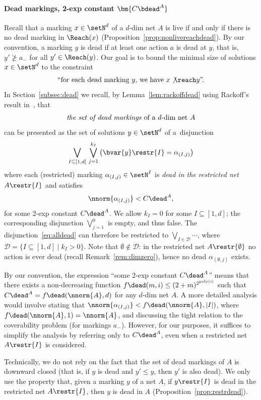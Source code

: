 \paragraph{Dead markings, 2-exp constant $\bm{C\bdead^A}$}
Recall that a marking $x\in\setN^d$ of a $d$-dim net $A$ is live if and only if there is no
dead marking in $\Reach(x)$
(Proposition~\ref{prop:nonlivereachdead}). By our convention, a
marking $y$ is dead if at least one action $a$ is dead at $y$, that
is, $y'\not\geq a_-$ for all $y'\in\Reach(y)$.
Our goal is to bound the minimal size of solutions $x\in\setN^d$ to the constraint
\begin{equation}\label{eq:firstconstr}
	\textnormal{``for each dead marking $y$, we have  $x\not\reach
	y$''.}
\end{equation}
In Section~\ref{subsec:dead} we recall, by
Lemma~\ref{lem:rackoffdead} using  Rackoff's
result in~\cite{DBLP:journals/tcs/Rackoff78}, that 
\begin{equation*}
	\textnormal{\emph{the set of dead markings} of a $d$-dim net
	$A$} 
\end{equation*}
	can be presented
as the set of solutions $y\in\setN^d$ 
of a~disjunction
\begin{equation}\label{eq:alldead}
	\bigvee_{I\subseteq [1,d]} \,\bigvee_{j=1}^{k_I}
	\left(\bvar{y}\restr{I}=\alpha_{(I,j)}\right)
\end{equation}
where 
each (restricted) marking $\alpha_{(I,j)}\in\setN^{I}$ is \emph{dead in the 
restricted net} $A\restr{I}$ and satisfies 
\[\nnorm{\alpha_{(I,j)}}< C\dead^A,\] for some 2-exp
constant $C\dead^A$.
We allow $k_I=0$ for some $I\subseteq [1,d]$; the corresponding
disjunction $\bigvee_{j=1}^{0}$ is empty, and thus false.  The
disjunction~\eqref{eq:alldead} can therefore be restricted to
$\bigvee_{I\in\mathcal{D}}\cdots$, where
$\mathcal{D}=\{I\subseteq[1,d] \mid k_I>0\}$.  
Note that $\emptyset\notin\mathcal{D}$: in the restricted net
$A\restr{\emptyset}$ no action is ever dead (recall
Remark~\ref{rem:dimzero}), hence no dead $\alpha_{(\emptyset,j)}$
exists.


\begin{rem}
By our convention, the expression ``some 2-exp constant $C\dead^A$''
	means that there exists a non-decreasing function $f\dead(m,i)\leq
	(2+m)^{2^{\text{poly}(i)}}$
such that $C\dead^A=f\dead(\nnorm{A},d)$ for
any $d$-dim net $A$.
A more detailed analysis would involve stating
that	$\nnorm{\alpha_{(I,j)}}< f\dead(\nnorm{A},|I|)$, where 
	$f\dead(\nnorm{A},1)=\nnorm{A}$, and discussing the tight
	relation to the coverability problem (for markings $a_-$). 
	However, for our  purposes, it suffices to simplify the
	analysis by referring only to
	$C\dead^A$, even when a restricted net $A\restr{I}$ is
	considered.

	Technically, we do not rely on the fact that the set of dead
	markings of $A$ is downward closed (that is, if $y$ is dead and $y'\leq y$,
	then $y'$ is also dead). We only use the property that,
	given a marking $y$ of a net $A$, 
if $y\restr{I}$ is dead in the
	restricted net $A\restr{I}$, then $y$ is dead in $A$
	(Proposition~\ref{prop:restrdead}).
\end{rem}


